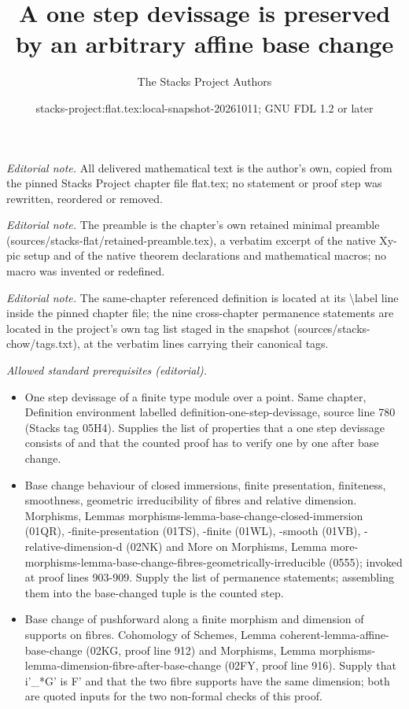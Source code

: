 \documentclass[10pt,a4paper]{amsart}
\title{A one step devissage is preserved by an arbitrary affine base change}
\author{The Stacks Project Authors}
\date{stacks-project:flat.tex:local-snapshot-20261011; GNU FDL 1.2 or later}
\theoremstyle{plain}
\theoremstyle{definition}
\theoremstyle{remark}
\numberwithin{equation}{subsection}
\begin{document}
\maketitle
\noindent\textit{Editorial note.} All delivered mathematical text is the author's own, copied from the pinned Stacks Project chapter file flat.tex; no statement or proof step was rewritten, reordered or removed.\par\medskip
\noindent\textit{Editorial note.} The preamble is the chapter's own retained minimal preamble (sources/stacks-flat/retained-preamble.tex), a verbatim excerpt of the native Xy-pic setup and of the native theorem declarations and mathematical macros; no macro was invented or redefined.\par\medskip
\noindent\textit{Editorial note.} The same-chapter referenced definition is located at its \textbackslash{}label line inside the pinned chapter file; the nine cross-chapter permanence statements are located in the project's own tag list staged in the snapshot (sources/stacks-chow/tags.txt), at the verbatim lines carrying their canonical tags.\par\medskip
\noindent\textit{Allowed standard prerequisites (editorial).}\begin{itemize}
\item One step devissage of a finite type module over a point. Same chapter, Definition environment labelled definition-one-step-devissage, source line 780 (Stacks tag 05H4). Supplies the list of properties that a one step devissage consists of and that the counted proof has to verify one by one after base change.
\item Base change behaviour of closed immersions, finite presentation, finiteness, smoothness, geometric irreducibility of fibres and relative dimension. Morphisms, Lemmas morphisms-lemma-base-change-closed-immersion (01QR), -finite-presentation (01TS), -finite (01WL), -smooth (01VB), -relative-dimension-d (02NK) and More on Morphisms, Lemma more-morphisms-lemma-base-change-fibres-geometrically-irreducible (0555); invoked at proof lines 903-909. Supply the list of permanence statements; assembling them into the base-changed tuple is the counted step.
\item Base change of pushforward along a finite morphism and dimension of supports on fibres. Cohomology of Schemes, Lemma coherent-lemma-affine-base-change (02KG, proof line 912) and Morphisms, Lemma morphisms-lemma-dimension-fibre-after-base-change (02FY, proof line 916). Supply that i'\_*G' is F' and that the two fibre supports have the same dimension; both are quoted inputs for the two non-formal checks of this proof.
\end{itemize}\medskip
\end{document}
